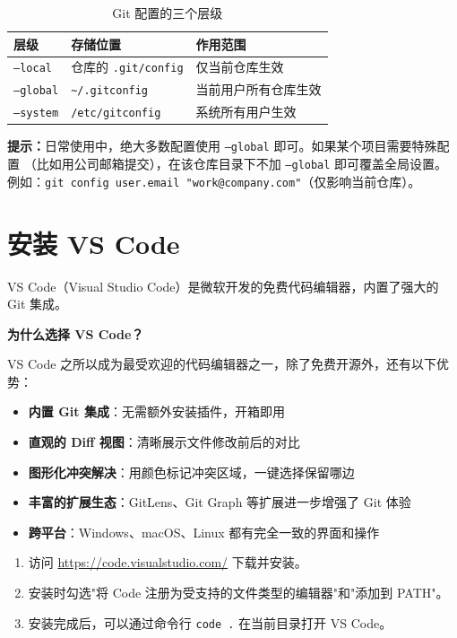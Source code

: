 \documentclass[12pt,a4paper,openany]{ctexbook}
\begin{document}
\begin{table}[h]
\centering
\caption{Git 配置的三个层级}\label{tab:config-levels}
\begin{tabularx}{\textwidth}{l l >{\raggedright\arraybackslash}X}
\toprule
\textbf{层级} & \textbf{存储位置} & \textbf{作用范围} \\
\midrule
\texttt{--local} & 仓库的 \texttt{.git/config} & 仅当前仓库生效 \\
\texttt{--global} & \texttt{\~{}/.gitconfig} & 当前用户所有仓库生效 \\
\texttt{--system} & \texttt{/etc/gitconfig} & 系统所有用户生效 \\
\bottomrule
\end{tabularx}
\end{table}

\medskip
\noindent\textbf{提示：}日常使用中，绝大多数配置使用 \texttt{--global} 即可。如果某个项目需要特殊配置
（比如用公司邮箱提交），在该仓库目录下不加 \texttt{--global} 即可覆盖全局设置。
例如：\texttt{git config user.email "work@company.com"}（仅影响当前仓库）。
\medskip

\section{安装 VS Code}

VS Code（Visual Studio Code）是微软开发的免费代码编辑器，内置了强大的 Git 集成。

\medskip
\textbf{为什么选择 VS Code？}

VS Code 之所以成为最受欢迎的代码编辑器之一，除了免费开源外，还有以下优势：
\begin{itemize}
  \item \textbf{内置 Git 集成}：无需额外安装插件，开箱即用
  \item \textbf{直观的 Diff 视图}：清晰展示文件修改前后的对比
  \item \textbf{图形化冲突解决}：用颜色标记冲突区域，一键选择保留哪边
  \item \textbf{丰富的扩展生态}：GitLens、Git Graph 等扩展进一步增强了 Git 体验
  \item \textbf{跨平台}：Windows、macOS、Linux 都有完全一致的界面和操作
\end{itemize}
\medskip

\medskip
\begin{enumerate}[leftmargin=1.5em]
  \item 访问 \url{https://code.visualstudio.com/} 下载并安装。
  \item 安装时勾选"将 Code 注册为受支持的文件类型的编辑器"和"添加到 PATH"。
  \item 安装完成后，可以通过命令行 \texttt{code .} 在当前目录打开 VS Code。
\end{enumerate}
\medskip
\end{document}
